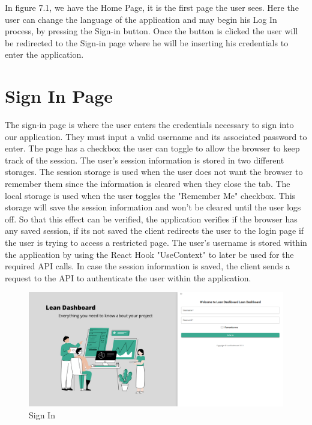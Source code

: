 \documentclass[a4paper,twoside,10pt]{report}
\begin{document}
In figure 7.1, we have the Home Page, it is the first page the user sees. Here the user can change the language of the application and may begin his Log In process, by pressing the Sign-in button. Once the button is clicked the user will be redirected to the Sign-in page where he will be inserting his credentials to enter the application.


\section{Sign In Page}
The sign-in page is where the user enters the credentials necessary to sign into our application.
They must input a valid username and its associated password to enter.
\newline
The page has a checkbox the user can toggle to allow the browser to keep track of the session. 
The user's session information is stored in two different storages.
\newline
The session storage is used when the user does not want the browser to remember them since the information is cleared when they close the tab.
\newline
The local storage is used when the user toggles the "Remember Me" checkbox. This storage will save the session information and won't be cleared until the user logs off.
So that this effect can be verified, the application verifies if the browser has any saved session, if its not saved the client redirects the user to the login page if the user is trying to access a restricted page.
\newline
The user's username is stored within the application by using the React Hook "UseContext" to later be used for the required API calls.
In case the session information is saved, the client sends a request to the API to authenticate the user within the application.

\begin{figure}[h!]
\center
  \includegraphics[width=\textwidth]{SignIn.png}
\caption{Sign In}
\end{figure}
\end{document}
